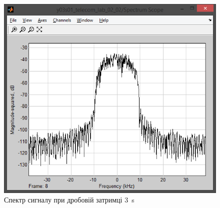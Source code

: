 \documentclass[
	a4paper,
	oneside,
	BCOR = 10mm,
	DIV = 12,
	12pt,
	headings = normal,
]{scrartcl}
\begin{document}
\begin{figure}[!htbp]
\begin{minipage}[t]{0.5\textwidth - 0.5em}
						\includegraphics[height = 8\baselineskip]{../01-solution/00-SNR-100db-noshift-modulator-spectrum.png}
						\caption{Спектр сигналу при дробовій затримці \SI{3}{\second}}
						\label{fig:fracdelay-scope}
					\end{minipage}%
				\end{figure}
\end{document}
